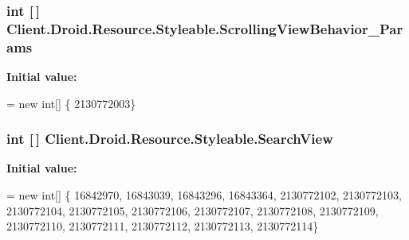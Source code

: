 \subsubsection[{Scrolling\+View\+Behavior\+\_\+\+Params}]{\setlength{\rightskip}{0pt plus 5cm}int \mbox{[}$\,$\mbox{]} Client.\+Droid.\+Resource.\+Styleable.\+Scrolling\+View\+Behavior\+\_\+\+Params\hspace{0.3cm}{\ttfamily [static]}}\label{classClient_1_1Droid_1_1Resource_1_1Styleable_aac517c1e4f748c673785f0bd8d2ecbab}
{\bfseries Initial value\+:}
\begin{DoxyCode}
= \textcolor{keyword}{new} \textcolor{keywordtype}{int}[]
            \{
                    2130772003\}
\end{DoxyCode}
\hypertarget{classClient_1_1Droid_1_1Resource_1_1Styleable_a27f92bdf187ac3d8aeb153b3d563d658}{}
\subsubsection[{Search\+View}]{\setlength{\rightskip}{0pt plus 5cm}int \mbox{[}$\,$\mbox{]} Client.\+Droid.\+Resource.\+Styleable.\+Search\+View\hspace{0.3cm}{\ttfamily [static]}}\label{classClient_1_1Droid_1_1Resource_1_1Styleable_a27f92bdf187ac3d8aeb153b3d563d658}
{\bfseries Initial value\+:}
\begin{DoxyCode}
= \textcolor{keyword}{new} \textcolor{keywordtype}{int}[]
            \{
                    16842970,
                    16843039,
                    16843296,
                    16843364,
                    2130772102,
                    2130772103,
                    2130772104,
                    2130772105,
                    2130772106,
                    2130772107,
                    2130772108,
                    2130772109,
                    2130772110,
                    2130772111,
                    2130772112,
                    2130772113,
                    2130772114\}
\end{DoxyCode}
\hypertarget{classClient_1_1Droid_1_1Resource_1_1Styleable_a6b2d1e8d632dca04bdce7f8dfa7e5bd2}{}
